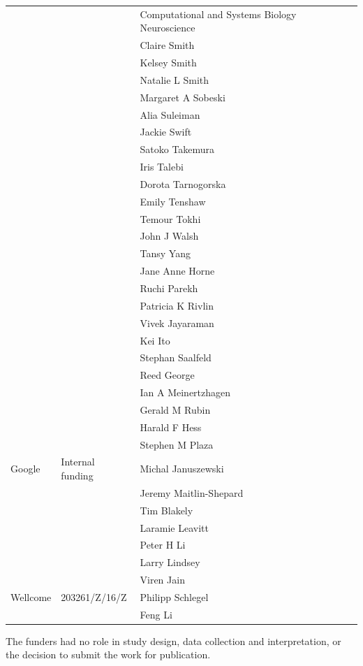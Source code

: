 \documentclass{article}
\begin{document}
\begin{center}\footnotesize
\begin{longtable}{lll}
 &  & Computational and Systems Biology Neuroscience \\
 &  & Claire Smith \\
 &  & Kelsey Smith \\
 &  & Natalie L Smith \\
 &  & Margaret A Sobeski \\
 &  & Alia Suleiman \\
 &  & Jackie Swift \\
 &  & Satoko Takemura \\
 &  & Iris Talebi \\
 &  & Dorota Tarnogorska \\
 &  & Emily Tenshaw \\
 &  & Temour Tokhi \\
 &  & John J Walsh \\
 &  & Tansy Yang \\
 &  & Jane Anne Horne \\
 &  & Ruchi Parekh \\
 &  & Patricia K Rivlin \\
 &  & Vivek Jayaraman \\
 &  & Kei Ito \\
 &  & Stephan Saalfeld \\
 &  & Reed George \\
 &  & Ian A Meinertzhagen \\
 &  & Gerald M Rubin \\
 &  & Harald F Hess \\
 &  & Stephen M Plaza \\
Google & Internal funding & Michal Januszewski \\
 &  & Jeremy Maitlin-Shepard \\
 &  & Tim Blakely \\
 &  & Laramie Leavitt \\
 &  & Peter H Li \\
 &  & Larry Lindsey \\
 &  & Viren Jain \\
Wellcome & 203261/Z/16/Z & Philipp Schlegel \\
 &  & Feng Li \\
\end{longtable}
\end{center}

The funders had no role in study design, data collection and interpretation, or the decision to submit the work for publication.
\end{document}
